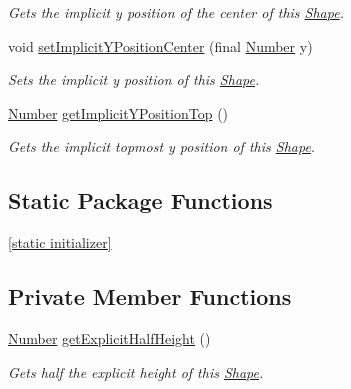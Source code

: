 \begin{DoxyCompactItemize}
\begin{DoxyCompactList}\small\item\em Gets the implicit y position of the center of this \hyperlink{classcom_1_1aarrelaakso_1_1drawl_1_1_shape}{Shape}. \end{DoxyCompactList}\item 
void \hyperlink{classcom_1_1aarrelaakso_1_1drawl_1_1_shape_a79c79420c626b8b2d2534b6c9aa64d8f}{set\+Implicit\+Y\+Position\+Center} (final \hyperlink{interfacecom_1_1aarrelaakso_1_1drawl_1_1_number}{Number} y)
\begin{DoxyCompactList}\small\item\em Sets the implicit y position of this \hyperlink{classcom_1_1aarrelaakso_1_1drawl_1_1_shape}{Shape}. \end{DoxyCompactList}\item 
\hyperlink{interfacecom_1_1aarrelaakso_1_1drawl_1_1_number}{Number} \hyperlink{classcom_1_1aarrelaakso_1_1drawl_1_1_shape_a6a52176302dd9b5d2bfc2d25409c310e}{get\+Implicit\+Y\+Position\+Top} ()
\begin{DoxyCompactList}\small\item\em Gets the implicit topmost y position of this \hyperlink{classcom_1_1aarrelaakso_1_1drawl_1_1_shape}{Shape}. \end{DoxyCompactList}\end{DoxyCompactItemize}
\subsection*{Static Package Functions}
\begin{DoxyCompactItemize}
\item 
\hyperlink{classcom_1_1aarrelaakso_1_1drawl_1_1_shape_ad2adcb85374cf5d6d59429628314e8d1}{\mbox{[}static initializer\mbox{]}}
\end{DoxyCompactItemize}
\subsection*{Private Member Functions}
\begin{DoxyCompactItemize}
\item 
\hyperlink{interfacecom_1_1aarrelaakso_1_1drawl_1_1_number}{Number} \hyperlink{classcom_1_1aarrelaakso_1_1drawl_1_1_shape_a10833aa0e7e8ef7b45c866ccf6d419e5}{get\+Explicit\+Half\+Height} ()
\begin{DoxyCompactList}\small\item\em Gets half the explicit height of this \hyperlink{classcom_1_1aarrelaakso_1_1drawl_1_1_shape}{Shape}. \end{DoxyCompactList}\end{DoxyCompactItemize}
